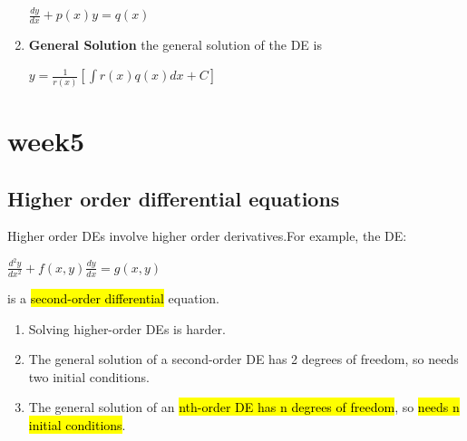\documentclass{article}
\begin{document}
\begin{enumerate}
          \begin{center}
            $\frac{dy}{dx} + p(x)y = q(x)$
          \end{center}

        \item \textbf{General Solution } the general solution of the DE is 
          \begin{center}
            $y = \frac{1}{r(x)} [\int r(x)q(x) dx + C]$
          \end{center}

      \end{enumerate}


  \section{week5}

    \subsection{Higher order differential equations}

      Higher order DEs involve higher order derivatives.For example, the DE:

      \begin{center}
        $\frac{d^2 y}{dx^2} + f(x,y) \frac{dy}{dx} = g(x,y)$
      \end{center}
      is a \hl{second-order differential} equation.

      \begin{enumerate}
        \item Solving higher-order DEs is harder.
        \item The general solution of a second-order DE has 2 degrees of freedom, so needs two initial conditions.
        \item The general solution of an \hl{nth-order DE has n degrees of freedom}, so \hl{needs n initial conditions}.
      \end{enumerate}
\end{document}
